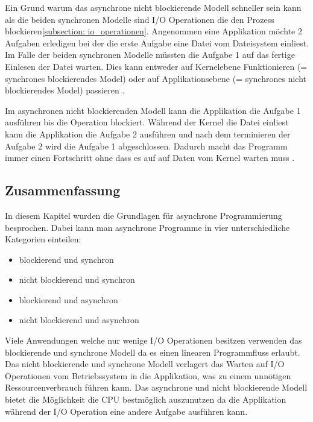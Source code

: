 Ein Grund warum das asynchrone nicht blockierende Modell schneller sein kann als die beiden synchronen Modelle sind I/O Operationen die den Prozess blockieren\ref{subsection: io_operationen}. Angenommen eine Applikation möchte 2 Aufgaben erledigen bei der die erste Aufgabe eine Datei vom Dateisystem einliest. Im Falle der beiden synchronen Modelle müssten die Aufgabe 1 auf das fertige Einlesen der Datei warten. Dies kann entweder auf Kernelebene Funktionieren (= synchrones blockierendes Model) oder auf Applikationsebene (= synchrones nicht blockierendes Model) passieren \cite[]{Pet2015}. 

Im asynchronen nicht blockierenden Modell kann die Applikation die Aufgabe 1 ausführen bis die Operation blockiert. Während der Kernel die Datei einliest kann die Applikation die Aufgabe 2 ausführen und nach dem terminieren der Aufgabe 2 wird die Aufgabe 1 abgeschlossen. Dadurch macht das Programm immer einen Fortschritt ohne dass es auf auf Daten vom Kernel warten muss \cite[]{Pet2015}.


\subsection{Zusammenfassung}

In diesem Kapitel wurden die Grundlagen für asynchrone Programmierung besprochen. Dabei kann man asynchrone Programme in vier unterschiedliche Kategorien einteilen:

\begin{itemize}
  \item blockierend und synchron
  \item nicht blockierend und synchron
  \item blockierend und asynchron
  \item nicht blockierend und asynchron
\end{itemize}    
Viele Anwendungen welche nur wenige I/O Operationen besitzen verwenden das blockierende und synchrone Modell da es einen linearen Programmfluss erlaubt. Das nicht blockierende und synchrone Modell verlagert das Warten auf I/O Operationen vom Betriebssystem in die Applikation, was zu einem unnötigen Ressourcenverbrauch führen kann. Das asynchrone und nicht blockierende Modell bietet die Möglichkeit die CPU bestmöglich auszunutzen da die Applikation während der I/O Operation eine andere Aufgabe ausführen kann.